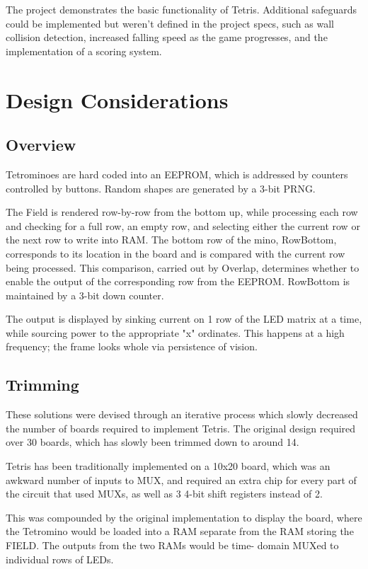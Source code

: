 \documentclass[letterpaper,titlepage,oneside]{article}
\begin{document}
The project demonstrates the basic functionality of Tetris. Additional safeguards could be implemented but weren't defined in the project specs, such as wall collision detection, increased falling speed as the game progresses, and the implementation of a scoring system.
\clearpage
\section{Design Considerations}

\subsection{Overview}
Tetrominoes are hard coded into an EEPROM, which is addressed by counters controlled by buttons. Random shapes are generated by a 3-bit PRNG.

The Field is rendered row-by-row from the bottom up, while processing each row and checking for a full row, an empty row, and selecting either the current row or the next row to write into RAM. The bottom row of the mino, RowBottom, corresponds to its location in the board and is compared with the current row being processed. This comparison, carried out by Overlap, determines whether to enable the output of the corresponding row from the EEPROM. RowBottom is maintained by a 3-bit down counter.

The output is displayed by sinking current on 1 row of the LED matrix at a time, while sourcing power to the appropriate "x" ordinates. This happens at a high frequency; the frame looks whole via persistence of vision.

\subsection{Trimming}
These solutions were devised through an iterative process which slowly decreased the number of boards required to implement Tetris. The original design required over 30 boards, which has slowly been trimmed down to around 14.

Tetris has been traditionally implemented on a 10x20 board, which was an awkward number of inputs to MUX, and required an extra chip for every part of the circuit that used MUXs, as well as 3 4-bit shift registers instead of 2. 

This was compounded by the original implementation to display the board, where the Tetromino would be loaded into a RAM separate from the RAM storing the FIELD. The outputs from the two RAMs would be time-	domain MUXed to individual rows of LEDs. 
\end{document}

